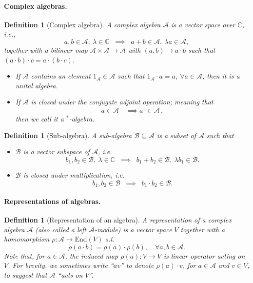 \documentclass[12pt]{article}
\theoremstyle{plain}
\newtheorem{definition}[theorem]{Definition}
\begin{document}
\paragraph{Complex algebras.}

\begin{definition}[Complex algebra]
A complex algebra $\mathcal{A}$ is a vector space over $\mathbb{C}$, i.e.,
 \[
    a,b \in \mathcal{A}, \ \lambda \in \mathbb{C} \;\; \implies \;\; a+b \in \mathcal{A}, \ \lambda a \in \mathcal{A},
    \]
together with a bilinear map $\mathcal{A} \times \mathcal{A} \rightarrow \mathcal{A}$ with $(a,b) \mapsto a \cdot b$ such that $(a\cdot b)\cdot c = a \cdot (b \cdot c)$.
\begin{itemize}
    \item If $\mathcal{A}$ contains an element $1_{\mathcal{A}} \in \mathcal{A}$ such that $1_{\mathcal{A}} \cdot a = a$, $\forall a \in \mathcal{A}$, then it is a unital algebra.
\item If $\mathcal{A}$ is closed under the conjugate adjoint operation; meaning that
$$
a \in \mathcal{A} \quad \implies a^\dag \in \mathcal{A} \, ,
$$
then we call it a $^*$-algebra.
\end{itemize}
\end{definition}

\begin{definition}[Sub-algebra]
A sub-algebra $\mathcal{B} \subseteq \mathcal{A}$ is a subset of $\mathcal{A}$ such that
\begin{itemize}
    \item \(\mathcal{B}\) is a vector subspace of \(\mathcal{A}\), i.e.
    \[
    b_1,b_2 \in \mathcal{B}, \ \lambda \in \mathbb{C} \;\; \implies \;\; b_1+b_2 \in \mathcal{B}, \ \lambda b_1 \in \mathcal{B}.
    \]

    \item \(\mathcal{B}\) is closed under multiplication, i.e.
    \[
    b_1,b_2  \in \mathcal{B} \;\; \implies \;\; b_1 \cdot b_2  \in \mathcal{B}.
    \]
\end{itemize}
    
\end{definition}

\paragraph{Representations of algebras.}

\begin{definition}[Representation of an algebra]
A representation of a complex algebra $\mathcal{A}$ (also called a left $\mathcal{A}$-module) is a vector space $V$ together with a homomorphism $\rho: \mathcal{A} \rightarrow \mathrm{End}(V)$ s.t.
$$
\rho(a \cdot b) = \rho(a) \cdot \rho(b), \quad \forall a,b \in \mathcal{A}.
$$
Note that, for $a \in \mathcal{A}$, the induced map $\rho(a) : V \rightarrow V$ is linear operator acting on $V$. For brevity, we sometimes write ``$av$'' to denote $\rho(a) \cdot v$, for $a \in \mathcal{A}$ and $v \in V$, to suggest that $\mathcal{A}$ ``acts on $V$''.
\end{definition}
\end{document}
